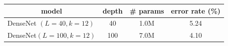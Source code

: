 
\begin{table}[h!]
\centering
\small
\begin{tabular}{l|cc|c}
\toprule
\multicolumn{1}{c|}{\bf model} & \multicolumn{1}{l}{\bf depth} & \multicolumn{1}{l|}{\bf \# params}  & \bf error rate (\%)  \\ \midrule
DenseNet $(L=40, k=12)$ \cite{Huang2016Densely} & 40 & 1.0M &  5.24  \\
DenseNet$(L=100, k=12)$ \cite{Huang2016Densely} & 100 & 7.0M &  4.10  \\

\end{tabular}
\end{table}
